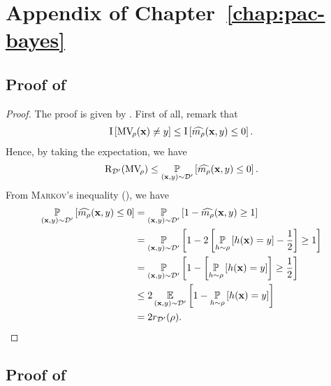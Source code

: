 \chapter{Appendix of Chapter~\ref{chap:pac-bayes}}
\label{ap:pac-bayes}

\begin{noaddcontents}
\section{Proof of }
\label{ap:pac-bayes:sec:proof-2gibbs}

\theoremgibbs*
\begin{proof}
The proof is given by \citet{GermainLacasseLavioletteMarchandRoy2015}.
First of all, remark that 
\begin{align*}
    \indic\LB \MVQ(\x) \ne \y \RB \le \indic\LB \OmMaQ(\x,\y)\le 0 \RB.
\end{align*}
Hence, by taking the expectation, we have 
\begin{align*}
    \Risk_{\Dp}(\MVQ) \le \PP_{(\x,\y)\sim\Dp}\LB \OmMaQ(\x,\y)\le 0 \RB.
\end{align*}
From \textsc{Markov}'s inequality (), we have 
\begin{align*}
    \PP_{(\x,\y)\sim\Dp}\LB \OmMaQ(\x,\y)\le 0 \RB &= \PP_{(\x,\y)\sim\Dp}\LB 1-\OmMaQ(\x,\y)\ge 1 \RB\\
    &= \PP_{(\x,\y)\sim\Dp}\LB 1-2\LB\PP_{\h\sim\Q}\LB \h(\x)=\y \RB - \frac{1}{2}\RB\ge 1 \RB\\
    &= \PP_{(\x,\y)\sim\Dp}\LB 1-\LB\PP_{\h\sim\Q}\LB \h(\x)=\y \RB\RB\ge \frac{1}{2} \RB\\
    &\le 2\EE_{(\x,\y)\sim\Dp}\LB 1-\PP_{\h\sim\Q}\LB \h(\x)=\y \RB\RB\\
    &= 2r_{\Dp}(\Q).
\end{align*}
\end{proof}

\section{Proof of }
\label{ap:pac-bayes:sec:proof-4joint}


\end{noaddcontents}

